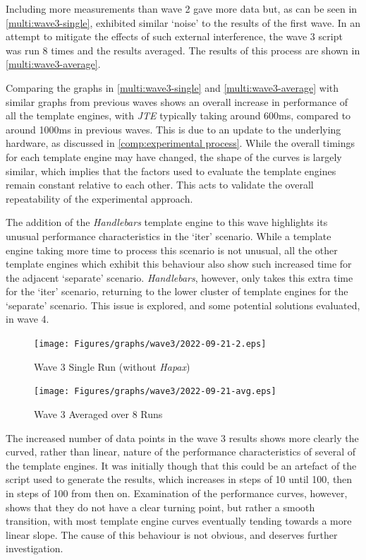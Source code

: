 Including more measurements than wave 2 gave more data but, as can be seen in \autoref{multi:wave3-single}, exhibited similar `noise' to the results of the first wave. In an attempt to mitigate the effects of such external interference, the wave 3 script was run 8 times and the results averaged. The results of this process are shown in \autoref{multi:wave3-average}. 

Comparing the graphs in \autoref{multi:wave3-single} and \autoref{multi:wave3-average} with similar graphs from previous waves shows an overall increase in performance of all the template engines, with \emph{JTE} typically taking around 600ms, compared to around 1000ms in previous waves. This is due to an update to the underlying hardware, as discussed in \autoref{comp:experimental process}. While the overall timings for each template engine may have changed, the shape of the curves is largely similar, which implies that the factors used to evaluate the template engines remain constant relative to each other. This acts to validate the overall repeatability of the experimental approach.

The addition of the \emph{Handlebars} template engine to this wave highlights its unusual performance characteristics in the `iter' scenario. While a template engine taking more time to process this scenario is not unusual, all the other template engines which exhibit this behaviour also show such increased time for the adjacent `separate' scenario. \emph{Handlebars}, however, only takes this extra time for the `iter' scenario, returning to the lower cluster of template engines for the `separate' scenario. This issue is explored, and some potential solutions evaluated, in wave 4.


\begin{figure}[ht!]
\centering
\texttt{[image: Figures/graphs/wave3/2022-09-21-2.eps]}
\caption{\label{multi:wave3-single}Wave 3 Single Run (without \emph{Hapax})}
\end{figure}

\begin{figure}[ht!]
\centering
\texttt{[image: Figures/graphs/wave3/2022-09-21-avg.eps]}
\caption{\label{multi:wave3-average}Wave 3 Averaged over 8 Runs}
\end{figure}

The increased number of data points in the wave 3 results shows more clearly the curved, rather than linear, nature of the performance characteristics of several of the template engines. It was initially though that this could be an artefact of the script used to generate the results, which increases in steps of 10 until 100, then in steps of 100 from then on. Examination of the performance curves, however, shows that they do not have a clear turning point, but rather a smooth transition, with most template engine curves eventually tending towards a more linear slope. The cause of this behaviour is not obvious, and deserves further investigation.

